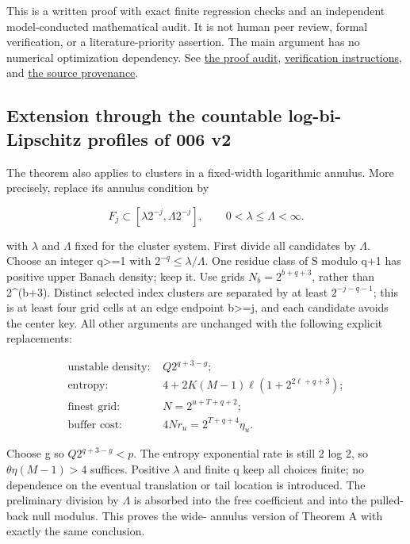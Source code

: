 \documentclass[
  11pt,
]{article}
\theoremstyle{remark}\newtheorem{remark}[theorem]{Remark}
\begin{document}
This is a written proof with exact finite regression checks and an
independent model-conducted mathematical audit. It is not human peer
review, formal verification, or a literature-priority assertion. The
main argument has no numerical optimization dependency. See
\href{PROOF_AUDIT.md}{the proof audit}, \href{README.md}{verification
instructions}, and \href{../avoidance-covering-provenance/README.md}{the
source provenance}.

\subsection{Extension through the countable log-bi-Lipschitz profiles of
006
v2}\label{extension-through-the-countable-log-bi-lipschitz-profiles-of-006-v2}

The theorem also applies to clusters in a fixed-width logarithmic
annulus. More precisely, replace its annulus condition by

\[
F_j\subset[\lambda2^{-j},\Lambda2^{-j}],\qquad0<\lambda\le\Lambda<\infty.
\]

with \(\lambda\) and \(\Lambda\) fixed for the cluster system. First
divide all candidates by \(\Lambda\). Choose an integer q\textgreater=1
with \(2^{-q}\le\lambda/\Lambda\). One residue class of S modulo q+1 has
positive upper Banach density; keep it. Use grids \(N_b=2^{b+q+3}\),
rather than 2\^{}(b+3). Distinct selected index clusters are separated
by at least \(2^{-j-q-1}\); this is at least four grid cells at an edge
endpoint b\textgreater=j, and each candidate avoids the center key. All
other arguments are unchanged with the following explicit replacements:

\[
\begin{aligned}\text{unstable density: }&Q2^{q+3-g};\\ \text{entropy: }&4+2K(M-1)\ell(1+2^{2\ell+q+3});\\ \text{finest grid: }&N=2^{u+T+q+2};\\ \text{buffer cost: }&4Nr_u=2^{T+q+4}\eta_u.\end{aligned}
\]

Choose g so \(Q2^{q+3-g}<p\). The entropy exponential rate is still 2
log 2, so \(\theta\eta(M-1)>4\) suffices. Positive \(\lambda\) and
finite q keep all choices finite; no dependence on the eventual
translation or tail location is introduced. The preliminary division by
\(\Lambda\) is absorbed into the free coefficient and into the
pulled-back null modulus. This proves the wide- annulus version of
Theorem A with exactly the same conclusion.
\end{document}
